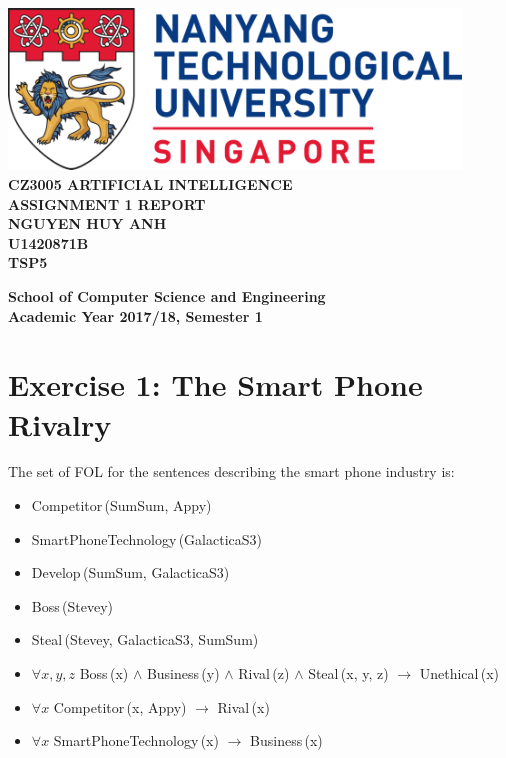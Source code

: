 \documentclass[11pt]{report}
\begin{document}
\begin{titlepage}
    \begin{center}
    
    \includegraphics[width=0.9\textwidth]{ntu_logo}
    \\[6cm]
    
    \uppercase{
    \textbf{CZ3005 Artificial Intelligence}\\
    \textbf{Assignment 1 Report}
    \\[2cm]
    \textbf{Nguyen Huy Anh}\\
    \textbf{U1420871B}\\
    \textbf{TSP5}
    }
    
    \vfill
    
    \textbf{School of Computer Science and Engineering}
    \\
    \textbf{Academic Year 2017/18, Semester 1}
    
    \end{center}
\end{titlepage}

\section*{Exercise 1: The Smart Phone Rivalry}

The set of FOL for the sentences describing the smart phone industry is:
\begin{itemize}
    \item Competitor\,(SumSum, Appy)
    \item SmartPhoneTechnology\,(GalacticaS3)
    \item Develop\,(SumSum, GalacticaS3)
    \item Boss\,(Stevey)
    \item Steal\,(Stevey, GalacticaS3, SumSum)
    \item \(\forall x,y,z\) Boss\,(x) \(\land \) Business\,(y) \(\land \)
    Rival\,(z) \(\land \) Steal\,(x, y, z) \(\to \) Unethical\,(x)
    \item \(\forall x\) Competitor\,(x, Appy) \(\to \) Rival\,(x)
    \item \(\forall x\) SmartPhoneTechnology\,(x) \(\to \) Business\,(x)
\end{itemize}
\end{document}
